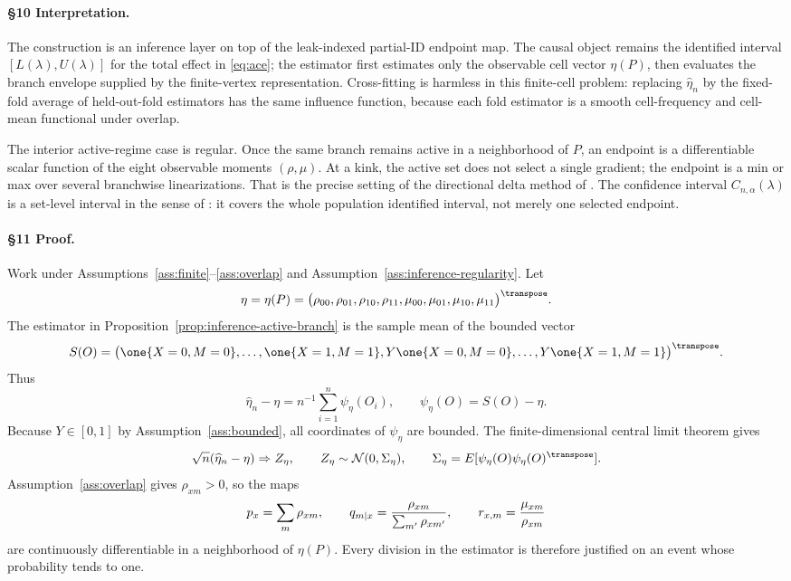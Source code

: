 \paragraph{\S10 Interpretation.}
The construction is an inference layer on top of the leak-indexed partial-ID endpoint
map.  The causal object remains the identified interval
\([L(\lambda),U(\lambda)]\) for the total effect in \eqref{eq:ace}; the estimator first
estimates only the observable cell vector \(\eta(P)\), then evaluates the branch
envelope supplied by the finite-vertex representation.  Cross-fitting is
harmless in this finite-cell problem: replacing \(\widehat\eta_n\) by the fixed-fold
average of held-out-fold estimators has the same influence function, because each
fold estimator is a smooth cell-frequency and cell-mean functional under overlap.

The interior active-regime case is regular.  Once the same branch remains active in a
neighborhood of \(P\), an endpoint is a differentiable scalar function of the eight
observable moments \((\rho,\mu)\).  At a kink, the active set does not select a single
gradient; the endpoint is a min or max over several branchwise linearizations.  That is
the precise setting of the directional delta method of
\citet{FangSantos2019DirectionallyDifferentiable}.  The confidence interval
\(C_{n,\alpha}(\lambda)\) is a set-level interval in the sense of
\citet{ChernozhukovHongTamer2007ParameterSets}: it covers the whole population
identified interval, not merely one selected endpoint.

\paragraph{\S11 Proof.}
Work under Assumptions~\ref{ass:finite}--\ref{ass:overlap} and
Assumption~\ref{ass:inference-regularity}.  Let
\[
  \eta=\eta(P)=\bigl(\rho_{00},\rho_{01},\rho_{10},\rho_{11},
                    \mu_{00},\mu_{01},\mu_{10},\mu_{11}\bigr)^\transpose .
\]
The estimator in Proposition~\ref{prop:inference-active-branch} is the sample mean
of the bounded vector
\[
  S(O)=\bigl(\one\{X=0,M=0\},\ldots,\one\{X=1,M=1\},
             Y\one\{X=0,M=0\},\ldots,Y\one\{X=1,M=1\}\bigr)^\transpose .
\]
Thus
\[
  \widehat\eta_n-\eta=n^{-1}\sum_{i=1}^n\psi_\eta(O_i),
  \qquad
  \psi_\eta(O)=S(O)-\eta .
\]
Because \(Y\in[0,1]\) by Assumption~\ref{ass:bounded}, all coordinates of
\(\psi_\eta\) are bounded.  The finite-dimensional central limit theorem gives
\[
  \sqrt n(\widehat\eta_n-\eta)\Rightarrow Z_\eta,
  \qquad
  Z_\eta\sim\mathcal N(0,\Sigma_\eta),
  \qquad
  \Sigma_\eta=E[\psi_\eta(O)\psi_\eta(O)^\transpose].
\]
Assumption~\ref{ass:overlap} gives \(\rho_{xm}>0\), so the maps
\[
  p_x=\sum_m\rho_{xm},\qquad
  q_{m\mid x}={\rho_{xm}\over\sum_{m'}\rho_{xm'}},\qquad
  r_{x,m}={\mu_{xm}\over\rho_{xm}}
\]
are continuously differentiable in a neighborhood of \(\eta(P)\).  Every division in
the estimator is therefore justified on an event whose probability tends to one.

